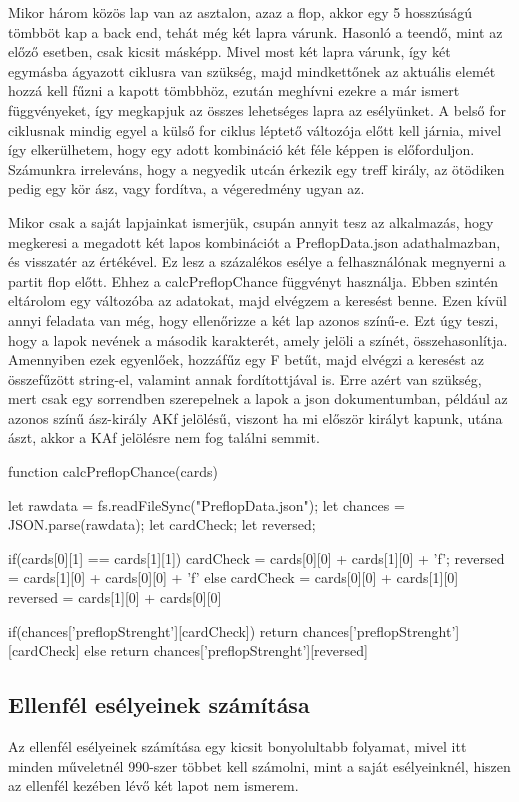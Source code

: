 Mikor három közös lap van az asztalon, azaz a flop, akkor egy 5 hosszúságú tömbböt kap a back end, tehát még két lapra várunk.  Hasonló a teendő, mint az előző esetben, csak kicsit másképp. Mivel most két lapra várunk, így két egymásba ágyazott ciklusra van szükség, majd mindkettőnek az aktuális elemét hozzá kell fűzni a kapott tömbbhöz, ezután meghívni ezekre a már ismert függvényeket, így megkapjuk az összes lehetséges lapra az esélyünket. A belső for ciklusnak mindig egyel a külső for ciklus léptető változója előtt kell járnia, mivel így elkerülhetem, hogy egy adott kombináció két féle képpen is előforduljon. Számunkra irreleváns, hogy a negyedik utcán érkezik egy treff király, az ötödiken pedig egy kör ász, vagy fordítva, a végeredmény ugyan az.

Mikor csak a saját lapjainkat ismerjük, csupán annyit tesz az alkalmazás, hogy megkeresi a megadott két lapos kombinációt a PreflopData.json adathalmazban, és visszatér az értékével. Ez lesz a százalékos esélye a felhasználónak megnyerni a partit flop előtt. Ehhez a calcPreflopChance függvényt használja. Ebben szintén eltárolom egy változóba az adatokat, majd elvégzem a keresést benne. Ezen kívül annyi feladata van még, hogy ellenőrizze a két lap azonos színű-e. Ezt úgy teszi, hogy a lapok nevének a második karakterét, amely jelöli a színét, összehasonlítja. Amennyiben ezek egyenlőek, hozzáfűz egy F betűt, majd elvégzi a keresést az összefűzött string-el, valamint annak fordítottjával is. Erre azért van szükség, mert csak egy sorrendben szerepelnek a lapok a json dokumentumban, például az azonos színű ász-király AKf jelölésű, viszont ha mi először királyt kapunk, utána ászt, akkor a KAf jelölésre nem fog találni semmit.

\begin{python}
function calcPreflopChance(cards){
  let rawdata = fs.readFileSync("PreflopData.json");
  let chances = JSON.parse(rawdata);
  let cardCheck;
  let reversed;

  if(cards[0][1] == cards[1][1]){
    cardCheck = cards[0][0] + cards[1][0] + 'f';
    reversed = cards[1][0] + cards[0][0] + 'f'
  } else {
    cardCheck = cards[0][0] + cards[1][0]
    reversed = cards[1][0] + cards[0][0] 
  }

  if(chances['preflopStrenght'][cardCheck]){
    return chances['preflopStrenght'][cardCheck]
  } else {
    return chances['preflopStrenght'][reversed]
  }
}
\end{python}

\subsection{Ellenfél esélyeinek számítása}
Az ellenfél esélyeinek számítása egy kicsit bonyolultabb folyamat, mivel itt minden műveletnél 990-szer többet kell számolni, mint a saját esélyeinknél, hiszen az ellenfél kezében lévő két lapot nem ismerem.

